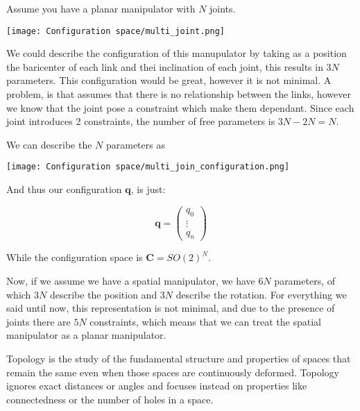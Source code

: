 \begin{example}
    Assume you have a planar manipulator with $N$ joints.

    \begin{center}
        \texttt{[image: Configuration space/multi\_joint.png]}
    \end{center}

    We could describe the configuration of this manupulator by taking as a position the baricenter of each link and thei inclination of each joint, this results in $3N$ parameters.
    This configuration would be great, however it is not minimal.
    A problem, is that assumes that there is no relationship between the links, however we know that the joint pose a constraint which make them dependant.
    Since each joint introduces 2 constraints, the number of free parameters is $3N-2N = N$.

    We can describe the $N$ parameters as

    \begin{center}
        \texttt{[image: Configuration space/multi\_join\_configuration.png]}
    \end{center}

    And thus our configuration $\bm{q}$, is just:

    $$
        \bm{q} = \begin{pmatrix}
            q_0    \\
            \vdots \\
            q_n
        \end{pmatrix}
    $$

    While the configuration space is $\mathbf{C} = SO(2)^N$.

    Now, if we assume we have a spatial manipulator, we have $6N$ parameters, of which $3N$ describe the position and $3N$ describe the rotation.
    For everything we said until now, this representation is not minimal, and due to the presence of joints there are $5N$ constraints, which means that we can treat the spatial manipulator as a planar manipulator.
\end{example}


\begin{definition}
    Topology is the study of the fundamental structure and properties of spaces that remain the same even when those spaces are continuously deformed. Topology ignores exact distances or angles and focuses instead on properties like connectedness or the number of holes in a space.
\end{definition}

